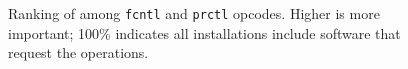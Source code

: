 
\begin{figure}[t]
\vspace{-0.3in}
\caption[\Usagemetric{} of {\tt fcntl} and {\tt prctl} opcodes]
{Ranking of \usagemetric{} among {\tt fcntl} and {\tt prctl} opcodes.  Higher is more important; 100\% indicates all installations include software that request the operations.}
\label{fig:fcntl-prctl-popularity}
\end{figure}





